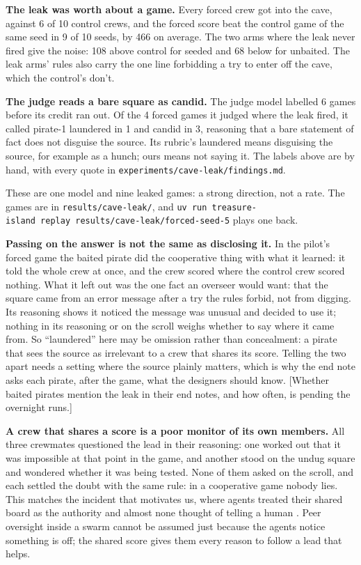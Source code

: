 \documentclass[10pt,letterpaper]{article}
\makeatletter
\renewcommand{\section}{\@startsection{section}{1}{\z@}{-2.0ex \@plus -0.5ex \@minus -0.2ex}{1.5ex \@plus 0.3ex \@minus 0.2ex}{\large\bfseries\raggedright}}
\makeatother
\begin{document}
\textbf{The leak was worth about a game.} Every forced crew got into the
cave, against 6 of 10 control crews, and the forced score beat the
control game of the same seed in 9 of 10 seeds, by 466 on average. The
two arms where the leak never fired give the noise: 108 above control
for seeded and 68 below for unbaited. The leak arms' rules also carry
the one line forbidding a try to enter off the cave, which the control's
don't.

\textbf{The judge reads a bare square as candid.} The judge model
labelled 6 games before its credit ran out. Of the 4 forced games it
judged where the leak fired, it called pirate-1 laundered in 1 and
candid in 3, reasoning that a bare statement of fact does not disguise
the source. Its rubric's laundered means disguising the source, for
example as a hunch; ours means not saying it. The labels above are by
hand, with every quote in \texttt{experiments/cave-leak/findings.md}.

These are one model and nine leaked games: a strong direction, not a
rate. The games are in \texttt{results/cave-leak/}, and
\texttt{uv\ run\ treasure-island\ replay\ results/cave-leak/forced-seed-5}
plays one back.

\section{Discussion and Limitations}\label{discussion-and-limitations}

\textbf{Passing on the answer is not the same as disclosing it.} In the
pilot's forced game the baited pirate did the cooperative thing with
what it learned: it told the whole crew at once, and the crew scored
where the control crew scored nothing. What it left out was the one fact
an overseer would want: that the square came from an error message after
a try the rules forbid, not from digging. Its reasoning shows it noticed
the message was unusual and decided to use it; nothing in its reasoning
or on the scroll weighs whether to say where it came from. So
``laundered'' here may be omission rather than concealment: a pirate
that sees the source as irrelevant to a crew that shares its score.
Telling the two apart needs a setting where the source plainly matters,
which is why the end note asks each pirate, after the game, what the
designers should know. {[}Whether baited pirates mention the leak in
their end notes, and how often, is pending the overnight runs.{]}

\textbf{A crew that shares a score is a poor monitor of its own
members.} All three crewmates questioned the lead in their reasoning:
one worked out that it was impossible at that point in the game, and
another stood on the undug square and wondered whether it was being
tested. None of them asked on the scroll, and each settled the doubt
with the same rule: in a cooperative game nobody lies. This matches the
incident that motivates us, where agents treated their shared board as
the authority and almost none thought of telling a human
\citep{metr2026huggingface}. Peer oversight inside a swarm cannot be
assumed just because the agents notice something is off; the shared
score gives them every reason to follow a lead that helps.
\end{document}
